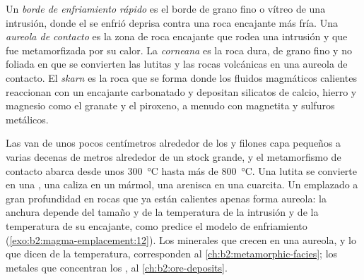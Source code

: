\begin{definition}\label{def:b2:magma-emplacement:aureole}
Un \emph{borde de enfriamiento rápido} es el borde de grano fino o vítreo de una
intrusión, donde el  se enfrió deprisa contra una roca encajante más fría. Una
\emph{aureola de contacto} es la zona de roca encajante que rodea una
intrusión y que fue metamorfizada por su calor. La \emph{corneana} es la
roca dura, de grano fino y no foliada en que se convierten las lutitas y las rocas volcánicas en
una aureola de contacto. El \emph{skarn} es la roca que se forma donde los fluidos
magmáticos calientes reaccionan con un encajante carbonatado y depositan silicatos de
calcio, hierro y magnesio como el granate y el piroxeno, a menudo con magnetita y sulfuros metálicos.
\end{definition}

Las  van de unos pocos centímetros alrededor de los  y filones capa pequeños a
varias decenas de metros alrededor de un stock grande, y el metamorfismo de contacto abarca
desde unos \qty{300}{\celsius} hasta más de \qty{800}{\celsius}. Una lutita se convierte en una
, una caliza en un mármol, una arenisca en una cuarcita. Un  emplazado a gran profundidad
en rocas que ya están calientes apenas forma aureola: la anchura depende del
tamaño y de la temperatura de la intrusión y de la temperatura de su encajante, como
predice el modelo de enfriamiento (\cref{exo:b2:magma-emplacement:12}). Los minerales que crecen en una aureola,
y lo que dicen de la temperatura, corresponden al \cref{ch:b2:metamorphic-facies};
los metales que concentran los , al \cref{ch:b2:ore-deposits}.

